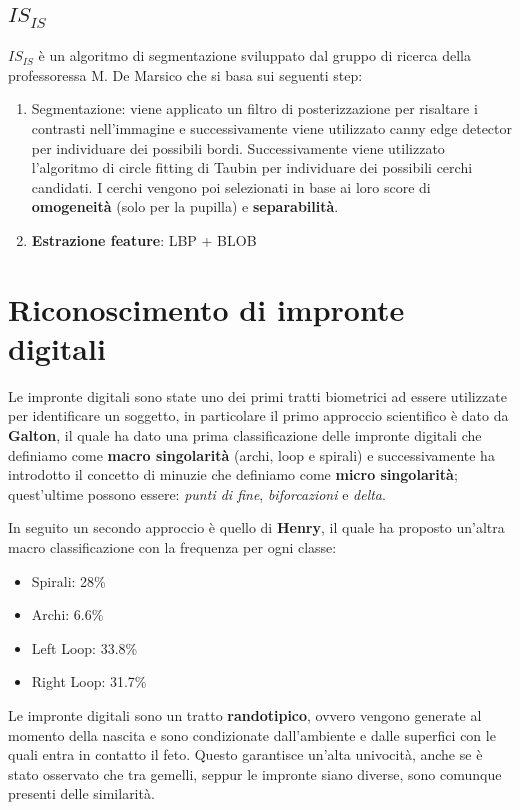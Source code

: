 \documentclass{article}
\begin{document}
\subsection{$IS_{IS}$}
$IS_{IS}$ è un algoritmo di segmentazione sviluppato dal gruppo di ricerca della professoressa M. De Marsico che si basa sui seguenti step:
\begin{enumerate}
    \item Segmentazione: viene applicato un filtro di posterizzazione per risaltare i contrasti nell'immagine e successivamente viene utilizzato canny edge detector per individuare dei possibili bordi. Successivamente viene utilizzato l'algoritmo di circle fitting di Taubin per individuare dei possibili cerchi candidati. I cerchi vengono poi selezionati in base ai loro score di \textbf{omogeneità} (solo per la pupilla) e \textbf{separabilità}.
    \item \textbf{Estrazione feature}: LBP + BLOB
\end{enumerate}

\section{Riconoscimento di impronte digitali}
Le impronte digitali sono state uno dei primi tratti biometrici ad essere utilizzate per identificare un soggetto, in particolare il primo approccio scientifico è dato da \textbf{Galton}, il quale ha dato una prima classificazione delle impronte digitali che definiamo come \textbf{macro singolarità} (archi, loop e spirali) e successivamente ha introdotto il concetto di minuzie che definiamo come \textbf{micro singolarità}; quest'ultime possono essere: \textit{punti di fine}, \textit{biforcazioni} e \textit{delta}.

\bigskip
In seguito un secondo approccio è quello di \textbf{Henry}, il quale ha proposto un'altra macro classificazione con la frequenza per ogni classe:
\begin{itemize}
    \item Spirali: 28\%
    \item Archi: 6.6\%
    \item Left Loop: 33.8\%
    \item Right Loop: 31.7\%
\end{itemize}

Le impronte digitali sono un tratto \textbf{randotipico}, ovvero vengono generate al momento della nascita e sono condizionate dall'ambiente e dalle superfici con le quali entra in contatto il feto. Questo garantisce un'alta univocità, anche se è stato osservato che tra gemelli, seppur le impronte siano diverse, sono comunque presenti delle similarità.
\end{document}

